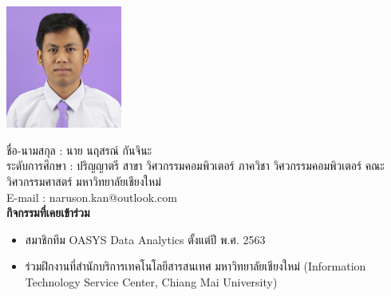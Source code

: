 \documentclass[final]{cpecmu}
\author{นายนฤสรณ์ กันจินะ}{Naruson Kanchina}{620612153}
\begin{document}


\pagestyle{empty}\cleardoublepage
\normalspacing \setcounter{page}{1}  \pagestyle{cpecmu}





\ifproject

\fi



\ifproject
\normalspacing
\appendix


\ifglossary\glossarypage\fi

\ifindex\indexpage\fi

\begin{biosketch}
\begin{center}
  \includegraphics[width=1.5in]{pic/my_pic.jpg}
\end{center}
ชื่อ-นามสกุล : นาย นฤสรณ์ กันจินะ \\
ระดับการศึกษา : ปริญญาตรี สาขา วิศวกรรมคอมพิวเตอร์ ภาควิชา วิศวกรรมคอมพิวเตอร์ คณะ วิศวกรรมศาสตร์ มหาวิทยาลัยเชียงใหม่ \\
E-mail : naruson.kan@outlook.com \\

\textbf{กิจกรรมที่เคยเข้าร่วม}
\begin{itemize}
  \item สมาชิกทีม OASYS Data Analytics ตั้งแต่ปี พ.ศ. 2563
  \item ร่วมฝึกงานที่สำนักบริการเทคโนโลยีสารสนเทศ มหาวิทยาลัยเชียงใหม่ (Information Technology Service Center, Chiang Mai University)
\end{itemize}
\end{biosketch}
\fi %
\end{document}
